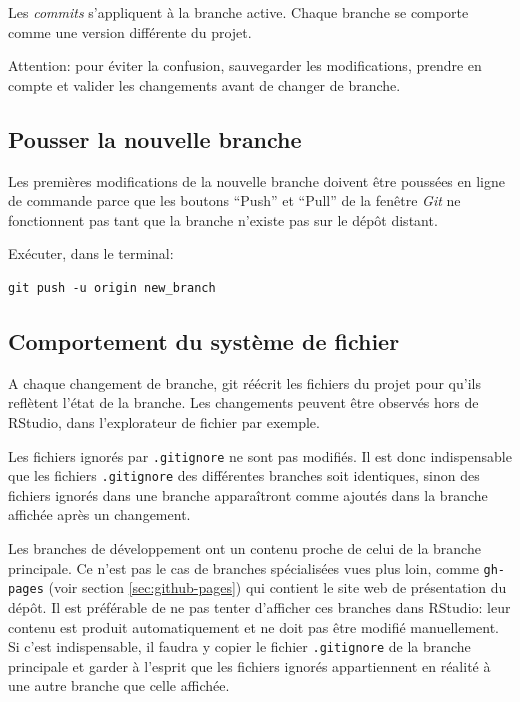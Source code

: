 \documentclass[
  12pt,
  french,
  a4paper,
  extrafontsizes,onecolumn,openright
  ]{memoir}
\begin{document}
Les \emph{commits} s'appliquent à la branche active.
Chaque branche se comporte comme une version différente du projet.

Attention: pour éviter la confusion, sauvegarder les modifications, prendre en compte et valider les changements avant de changer de branche.

\subsection{Pousser la nouvelle branche}\label{pousser-la-nouvelle-branche}

Les premières modifications de la nouvelle branche doivent être poussées en ligne de commande parce que les boutons \enquote{Push} et \enquote{Pull} de la fenêtre \emph{Git} ne fonctionnent pas tant que la branche n'existe pas sur le dépôt distant.

Exécuter, dans le terminal:

\begin{verbatim}
git push -u origin new_branch
\end{verbatim}

\subsection{Comportement du système de fichier}\label{comportement-du-systuxe8me-de-fichier}

A chaque changement de branche, git réécrit les fichiers du projet pour qu'ils reflètent l'état de la branche.
Les changements peuvent être observés hors de RStudio, dans l'explorateur de fichier par exemple.

Les fichiers ignorés par \texttt{.gitignore} ne sont pas modifiés.
Il est donc indispensable que les fichiers \texttt{.gitignore} des différentes branches soit identiques, sinon des fichiers ignorés dans une branche apparaîtront comme ajoutés dans la branche affichée après un changement.

Les branches de développement ont un contenu proche de celui de la branche principale.
Ce n'est pas le cas de branches spécialisées vues plus loin, comme \texttt{gh-pages} (voir section \ref{sec:github-pages}) qui contient le site web de présentation du dépôt.
Il est préférable de ne pas tenter d'afficher ces branches dans RStudio: leur contenu est produit automatiquement et ne doit pas être modifié manuellement.
Si c'est indispensable, il faudra y copier le fichier \texttt{.gitignore} de la branche principale et garder à l'esprit que les fichiers ignorés appartiennent en réalité à une autre branche que celle affichée.
\end{document}
